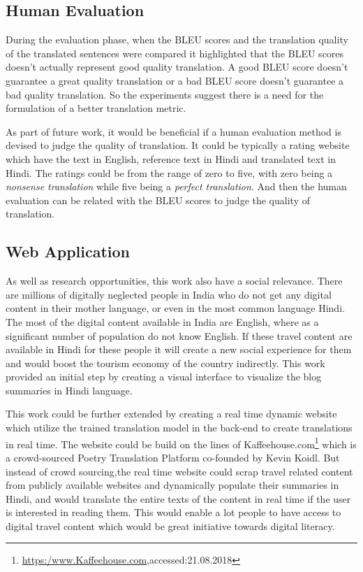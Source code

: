 \subsection{Human Evaluation}

During the evaluation phase, when the BLEU scores and the translation quality of the translated sentences were compared it highlighted that the BLEU scores doesn't actually represent good quality translation. A good BLEU score doesn't guarantee a great quality translation or a bad BLEU score doesn't guarantee a bad quality translation. So the experiments suggest there is a need for the formulation of a better translation metric.

As part of future work, it would be beneficial if a human evaluation method is devised to judge the quality of translation. It could be typically a rating website which have the text in English, reference text in Hindi and translated text in Hindi. The ratings could be from the range of zero to five, with zero being a \textit{nonsense translation} while five being a \textit{perfect translation}. And then the human evaluation can be related with the BLEU scores to judge the quality of translation.  

\subsection{Web Application}
As well as research opportunities, this work also have a social relevance. There are millions of digitally neglected people in India who do not get any digital content in their mother language, or even in the most common language Hindi. The most of the digital content available in India are English, where as a significant number of population do not know English. If these travel content are available in Hindi for these people it will create a new social experience for them and would boost the tourism economy of the country indirectly.  This work provided an initial step by creating a visual interface to visualize the blog summaries in Hindi language.

This work could be further extended by creating a real time dynamic website which utilize the trained translation model in the back-end to create translations in real time. The website could be build on the lines of Kaffeehouse.com\footnote{\url{https:/www.Kaffeehouse.com},accessed:21.08.2018} which is a crowd-sourced Poetry Translation Platform co-founded by Kevin Koidl. But instead of crowd sourcing,the real time website could scrap travel related content from publicly available websites and dynamically populate their summaries in Hindi, and would translate the entire texts of the content in real time if the user is interested in reading them. This would enable a lot people to have access to digital travel content which would be great initiative towards digital literacy. 